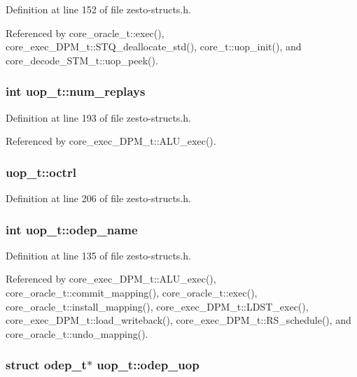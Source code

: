 Definition at line 152 of file zesto-structs.h.

Referenced by core\_\-oracle\_\-t::exec(), core\_\-exec\_\-DPM\_\-t::STQ\_\-deallocate\_\-std(), core\_\-t::uop\_\-init(), and core\_\-decode\_\-STM\_\-t::uop\_\-peek().
\subsubsection[{num\_\-replays}]{\setlength{\rightskip}{0pt plus 5cm}int {\bf uop\_\-t::num\_\-replays}}\label{structuop__t_893e89c3ea74d28385e53253dbeb7f5b}




Definition at line 193 of file zesto-structs.h.

Referenced by core\_\-exec\_\-DPM\_\-t::ALU\_\-exec().
\subsubsection[{octrl}]{ {\bf uop\_\-t::octrl}}\label{structuop__t_fe9be4f05b3b8d5b2161035b3c74e8f9}




Definition at line 206 of file zesto-structs.h.
\subsubsection[{odep\_\-name}]{\setlength{\rightskip}{0pt plus 5cm}int {\bf uop\_\-t::odep\_\-name}}\label{structuop__t_6b25418271a661494d1ddd662cd1ecf8}




Definition at line 135 of file zesto-structs.h.

Referenced by core\_\-exec\_\-DPM\_\-t::ALU\_\-exec(), core\_\-oracle\_\-t::commit\_\-mapping(), core\_\-oracle\_\-t::exec(), core\_\-oracle\_\-t::install\_\-mapping(), core\_\-exec\_\-DPM\_\-t::LDST\_\-exec(), core\_\-exec\_\-DPM\_\-t::load\_\-writeback(), core\_\-exec\_\-DPM\_\-t::RS\_\-schedule(), and core\_\-oracle\_\-t::undo\_\-mapping().
\subsubsection[{odep\_\-uop}]{\setlength{\rightskip}{0pt plus 5cm}struct {\bf odep\_\-t}$\ast$ {\bf uop\_\-t::odep\_\-uop}\hspace{0.3cm}{\tt  [read]}}\label{structuop__t_26d4b1db6fdef492b6f61b9624455f7c}




